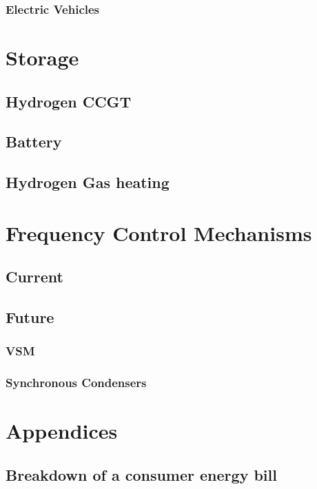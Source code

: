 \documentclass[11pt]{article}
\numberwithin{equation}{section}
\begin{document}
\subsubsection{Electric Vehicles \label{secEVs}}
\label{sec:org68b57b0}

\section{Storage}
\label{sec:org1a98f66}
\subsection{Hydrogen CCGT}
\label{sec:orgb8cd4c6}
\subsection{Battery}
\label{sec:orgb5d79a8}
\subsection{Hydrogen Gas heating}
\label{sec:org96d1743}
\section{Frequency Control Mechanisms}
\label{sec:org3164676}
\subsection{Current}
\label{sec:orgdfda133}
\subsection{Future}
\label{sec:org37dbed3}
\subsubsection{VSM}
\label{sec:org938f2a9}
\subsubsection{Synchronous Condensers}
\label{sec:orgeec48dc}

\section{Appendices}
\label{sec:org17dcebe}
\subsection{Breakdown of a consumer energy bill}
\label{sec:org157e9f4}
\end{document}
